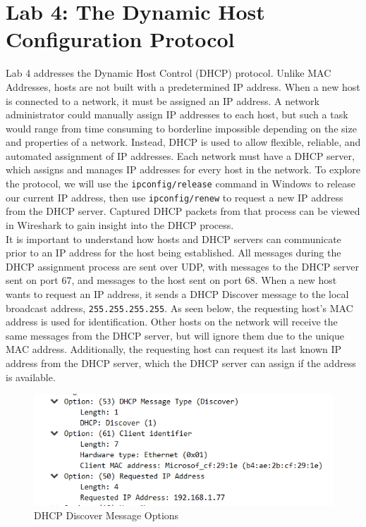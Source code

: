 \documentclass[10pt]{IEEEtran}
\begin{document}
\section{Lab 4: The Dynamic Host Configuration Protocol}

Lab 4 addresses the Dynamic Host Control (DHCP) protocol. Unlike MAC Addresses, hosts are not built with a predetermined IP address. When a new host is connected to a network, it must be assigned an IP address. A network administrator could manually assign IP addresses to each host, but such a task would range from time consuming to borderline impossible depending on the size and properties of a network. Instead, DHCP is used to allow flexible, reliable, and automated assignment of IP addresses. Each network must have a DHCP server, which assigns and manages IP addresses for every host in the network. To explore the protocol, we will use the {\tt ipconfig/release} command in Windows to release our current IP address, then use {\tt ipconfig/renew} to request a new IP address from the DHCP server. Captured DHCP packets from that process can be viewed in Wireshark to gain insight into the DHCP process.\\

It is important to understand how hosts and DHCP servers can communicate prior to an IP address for the host being established. All messages during the DHCP assignment process are sent over UDP, with messages to the DHCP server sent on port 67, and messages to the host sent on port 68. When a new host wants to request an IP address, it sends a DHCP Discover message to the local broadcast address, {\tt 255.255.255.255}. As seen below, the requesting host's MAC address is used for identification. Other hosts on the network will receive the same messages from the DHCP server, but will ignore them due to the unique MAC address. Additionally, the requesting host can request its last known IP address from the DHCP server, which the DHCP server can assign if the address is available.

\begin{figure}[h!]

	\includegraphics[width=\linewidth]{DHCPDiscovery.png}
	\caption{DHCP Discover Message Options}
	\label{fig:dhcpCap1}
\end{figure}
 
\end{document}
